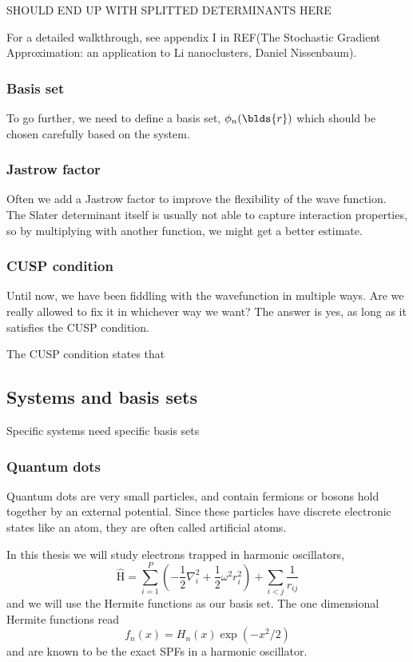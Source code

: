 SHOULD END UP WITH SPLITTED DETERMINANTS HERE

For a detailed walkthrough, see appendix I in REF(The Stochastic Gradient Approximation: an application to Li nanoclusters, Daniel Nissenbaum). 

\subsubsection{Basis set} \label{subsubsec:basisset}
To go further, we need to define a basis set, $\phi_n(\blds{r})$ which should be chosen carefully based on the system. 

\subsubsection{Jastrow factor} \label{subsubsec:jastrow}
Often we add a Jastrow factor to improve the flexibility of the wave function. The Slater determinant itself is usually not able to capture interaction properties, so by multiplying with another function, we might get a better estimate. 

\subsubsection{CUSP condition} \label{subsubsec:cusp}
Until now, we have been fiddling with the wavefunction in multiple ways. Are we really allowed to fix it in  whichever way we want? The answer is yes, as long as it satisfies the CUSP condition. 

The CUSP condition states that 

\subsection{Systems and basis sets} \label{subsec:potentials}

Specific systems need specific basis sets

\subsubsection{Quantum dots} \label{subsubsec:quantumdots}
Quantum dots are very small particles, and contain fermions or bosons hold together by an external potential. Since these particles have discrete electronic states like an atom, they are often called artificial atoms. 

In this thesis we will study electrons trapped in harmonic oscillators,
\begin{equation}
\label{eq:HOHamiltonian}
\hat{\text{H}} = \sum_{i=1}^{P} (-\frac{1}{2} \nabla_i^2 + \frac{1}{2} \omega^2 r_i ^2) + \sum_{i<j} \frac{1}{r_{ij}} 
\end{equation}
and we will use the Hermite functions as our basis set. The one dimensional Hermite functions read
\begin{equation}
f_n(x)=H_n(x)\exp(-x^2/2)
\end{equation}
and are known to be the exact SPFs in a harmonic oscillator. 

